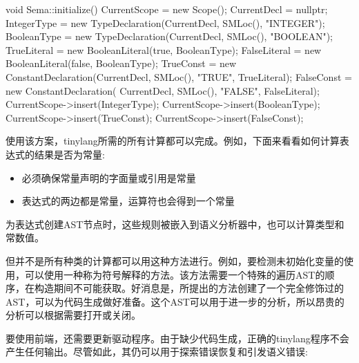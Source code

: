 \begin{cpp}
void Sema::initialize() {
    CurrentScope = new Scope();
    CurrentDecl = nullptr;
    IntegerType =
        new TypeDeclaration(CurrentDecl, SMLoc(), "INTEGER");
    BooleanType =
        new TypeDeclaration(CurrentDecl, SMLoc(), "BOOLEAN");
    TrueLiteral = new BooleanLiteral(true, BooleanType);
    FalseLiteral = new BooleanLiteral(false, BooleanType);
    TrueConst = new ConstantDeclaration(CurrentDecl, SMLoc(),
                                        "TRUE", TrueLiteral);
    FalseConst = new ConstantDeclaration(
        CurrentDecl, SMLoc(), "FALSE", FalseLiteral);
    CurrentScope->insert(IntegerType);
    CurrentScope->insert(BooleanType);
    CurrentScope->insert(TrueConst);
    CurrentScope->insert(FalseConst);
}
\end{cpp}

使用该方案，tinylang所需的所有计算都可以完成。例如，下面来看看如何计算表达式的结果是否为常量:

\begin{itemize}
\item
必须确保常量声明的字面量或引用是常量

\item
表达式的两边都是常量，运算符也会得到一个常量
\end{itemize}

为表达式创建AST节点时，这些规则被嵌入到语义分析器中，也可以计算类型和常数值。

但并不是所有种类的计算都可以用这种方法进行。例如，要检测未初始化变量的使用，可以使用一种称为符号解释的方法。该方法需要一个特殊的遍历AST的顺序，在构造期间不可能获取。好消息是，所提出的方法创建了一个完全修饰过的AST，可以为代码生成做好准备。这个AST可以用于进一步的分析，所以昂贵的分析可以根据需要打开或关闭。

要使用前端，还需要更新驱动程序。由于缺少代码生成，正确的tinylang程序不会产生任何输出。尽管如此，其仍可以用于探索错误恢复和引发语义错误:

